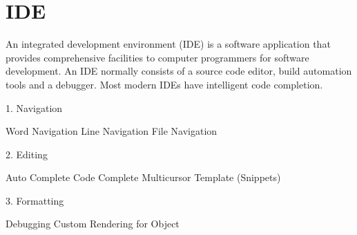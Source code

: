 \section{IDE}

An integrated development environment (IDE) is a software application that provides comprehensive facilities to computer programmers for software development. An IDE normally consists of a source code editor, build automation tools and a debugger. Most modern IDEs have intelligent code completion.

1. Navigation

Word Navigation Line Navigation File Navigation

2. Editing

Auto Complete Code Complete Multicursor Template (Snippets)

3. Formatting

Debugging
Custom Rendering for Object